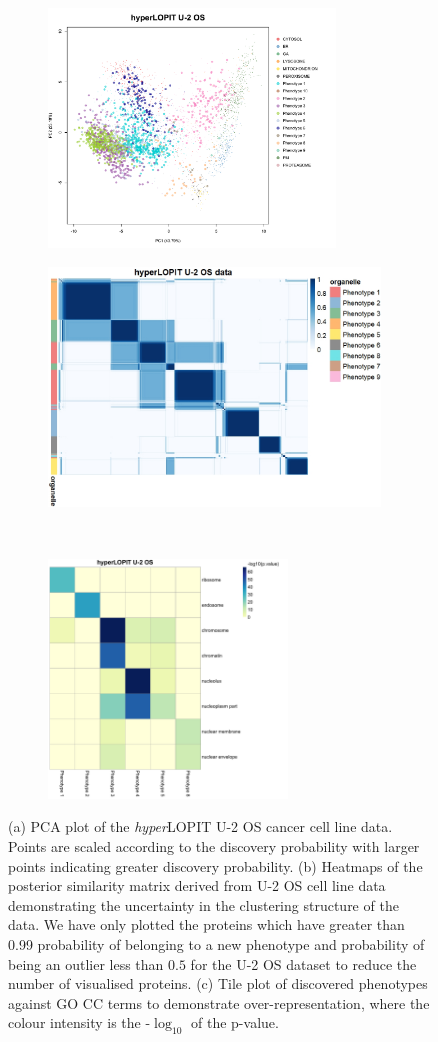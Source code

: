 \documentclass[12pt,english]{article}
\begin{document}
\begin{figure}[ht]
	\begin{subfigure}[t]{0.5\textwidth}
	\centering
	\includegraphics[height=2.5in]{pcau2oshl.pdf}
	\caption{}
\end{subfigure}
\begin{subfigure}[t]{0.5\textwidth}
	\centering
	\includegraphics[height=2.5in]{heatmapuU2oshl.jpeg}
	\caption{}
\end{subfigure}
~
\begin{subfigure}[t]{\textwidth}
	\centering
	\includegraphics[height=2.5in]{pvaluesu2os}
	\caption{}
\end{subfigure}
	\caption{(a) PCA plot of the \textit{hyper}LOPIT U-2 OS cancer cell line data. Points are scaled according to the discovery probability with larger points indicating greater discovery probability. (b) Heatmaps of the posterior similarity matrix derived from U-2 OS cell line data demonstrating the uncertainty in the clustering structure of the data. We have only plotted the proteins which have greater than 0.99 probability of belonging to a new phenotype and probability of being an outlier less than $0.5$ for the U-2 OS dataset to reduce the number of visualised proteins. (c) Tile plot of discovered phenotypes against GO CC terms to demonstrate over-representation, where the colour intensity is the -$\log_{10}$ of the p-value.}
	\label{figure:chromatin}
\end{figure}
\clearpage
\end{document}
